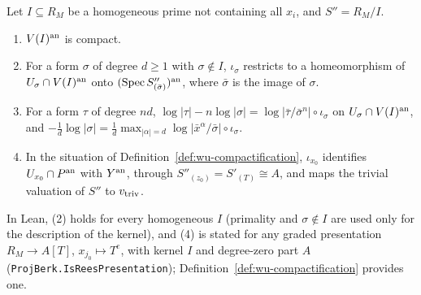 \begin{lemma}\label{lem:wu-proj-chart}
\leanok
{}
Let $I\subseteq R_M$ be a homogeneous prime not containing all $x_i$, and $S''=R_M/I$.
\begin{enumerate}
\item $V(I)^{\mathrm{an}}$ is compact.
\item For a form $\sigma$ of degree $d\ge1$ with $\sigma\notin I$, $\iota_\sigma$ restricts to a homeomorphism of
$U_\sigma\cap V(I)^{\mathrm{an}}$ onto $(\operatorname{Spec} S''_{(\bar\sigma)})^{\mathrm{an}}$, where $\bar\sigma$ is the image of $\sigma$.
\item For a form $\tau$ of degree $nd$, $\log|\tau|-n\log|\sigma|=\log|\bar\tau/\bar\sigma^n|\circ\iota_\sigma$ on
$U_\sigma\cap V(I)^{\mathrm{an}}$, and $-\frac1d\log|\sigma|=\frac1d\max_{|\alpha|=d}\log|\bar x^\alpha/\bar\sigma|\circ\iota_\sigma$.
\item In the situation of Definition~\ref{def:wu-compactification}, $\iota_{x_0}$ identifies $U_{x_0}\cap P^{\mathrm{an}}$
with $Y^{\mathrm{an}}$, through $S''_{(z_0)}=S'_{(T)}\cong A$, and maps the trivial valuation of $S''$ to $v_{\mathrm{triv}}$.
\end{enumerate}
In Lean, (2) holds for every homogeneous $I$ (primality and $\sigma\notin I$ are used only for the description of
the kernel), and (4) is stated for any graded presentation $R_M\to A[T]$, $x_{j_0}\mapsto T^e$, with kernel $I$ and
degree-zero part $A$ (\texttt{ProjBerk.IsReesPresentation}); Definition~\ref{def:wu-compactification} provides one.
\end{lemma}

